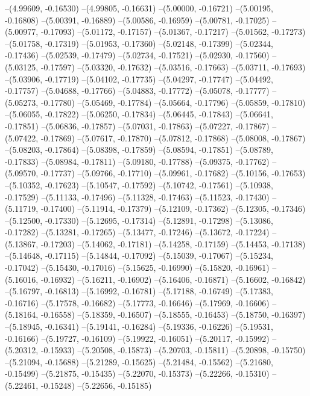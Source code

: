 --(4.99609, -0.16530)
--(4.99805, -0.16631)
--(5.00000, -0.16721)
--(5.00195, -0.16808)
--(5.00391, -0.16889)
--(5.00586, -0.16959)
--(5.00781, -0.17025)
--(5.00977, -0.17093)
--(5.01172, -0.17157)
--(5.01367, -0.17217)
--(5.01562, -0.17273)
--(5.01758, -0.17319)
--(5.01953, -0.17360)
--(5.02148, -0.17399)
--(5.02344, -0.17436)
--(5.02539, -0.17479)
--(5.02734, -0.17521)
--(5.02930, -0.17560)
--(5.03125, -0.17597)
--(5.03320, -0.17632)
--(5.03516, -0.17663)
--(5.03711, -0.17693)
--(5.03906, -0.17719)
--(5.04102, -0.17735)
--(5.04297, -0.17747)
--(5.04492, -0.17757)
--(5.04688, -0.17766)
--(5.04883, -0.17772)
--(5.05078, -0.17777)
--(5.05273, -0.17780)
--(5.05469, -0.17784)
--(5.05664, -0.17796)
--(5.05859, -0.17810)
--(5.06055, -0.17822)
--(5.06250, -0.17834)
--(5.06445, -0.17843)
--(5.06641, -0.17851)
--(5.06836, -0.17857)
--(5.07031, -0.17863)
--(5.07227, -0.17867)
--(5.07422, -0.17869)
--(5.07617, -0.17870)
--(5.07812, -0.17868)
--(5.08008, -0.17867)
--(5.08203, -0.17864)
--(5.08398, -0.17859)
--(5.08594, -0.17851)
--(5.08789, -0.17833)
--(5.08984, -0.17811)
--(5.09180, -0.17788)
--(5.09375, -0.17762)
--(5.09570, -0.17737)
--(5.09766, -0.17710)
--(5.09961, -0.17682)
--(5.10156, -0.17653)
--(5.10352, -0.17623)
--(5.10547, -0.17592)
--(5.10742, -0.17561)
--(5.10938, -0.17529)
--(5.11133, -0.17496)
--(5.11328, -0.17463)
--(5.11523, -0.17430)
--(5.11719, -0.17400)
--(5.11914, -0.17379)
--(5.12109, -0.17362)
--(5.12305, -0.17346)
--(5.12500, -0.17330)
--(5.12695, -0.17314)
--(5.12891, -0.17298)
--(5.13086, -0.17282)
--(5.13281, -0.17265)
--(5.13477, -0.17246)
--(5.13672, -0.17224)
--(5.13867, -0.17203)
--(5.14062, -0.17181)
--(5.14258, -0.17159)
--(5.14453, -0.17138)
--(5.14648, -0.17115)
--(5.14844, -0.17092)
--(5.15039, -0.17067)
--(5.15234, -0.17042)
--(5.15430, -0.17016)
--(5.15625, -0.16990)
--(5.15820, -0.16961)
--(5.16016, -0.16932)
--(5.16211, -0.16902)
--(5.16406, -0.16871)
--(5.16602, -0.16842)
--(5.16797, -0.16813)
--(5.16992, -0.16781)
--(5.17188, -0.16749)
--(5.17383, -0.16716)
--(5.17578, -0.16682)
--(5.17773, -0.16646)
--(5.17969, -0.16606)
--(5.18164, -0.16558)
--(5.18359, -0.16507)
--(5.18555, -0.16453)
--(5.18750, -0.16397)
--(5.18945, -0.16341)
--(5.19141, -0.16284)
--(5.19336, -0.16226)
--(5.19531, -0.16166)
--(5.19727, -0.16109)
--(5.19922, -0.16051)
--(5.20117, -0.15992)
--(5.20312, -0.15933)
--(5.20508, -0.15873)
--(5.20703, -0.15811)
--(5.20898, -0.15750)
--(5.21094, -0.15688)
--(5.21289, -0.15625)
--(5.21484, -0.15562)
--(5.21680, -0.15499)
--(5.21875, -0.15435)
--(5.22070, -0.15373)
--(5.22266, -0.15310)
--(5.22461, -0.15248)
--(5.22656, -0.15185)
